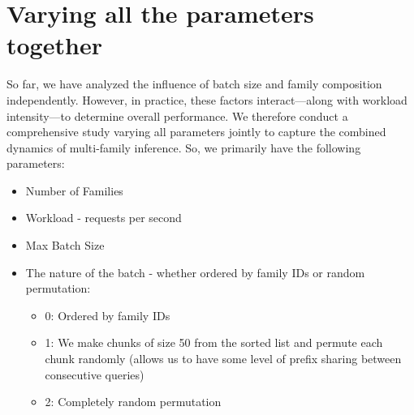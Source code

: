 \section{Varying all the parameters together}
So far, we have analyzed the influence of batch size and family composition independently. However, in practice, these factors interact—along with workload intensity—to determine overall performance. We therefore conduct a comprehensive study varying all parameters jointly to capture the combined dynamics of multi-family inference. So, we primarily have the following parameters:
\begin{itemize}
    \item Number of Families
    \item Workload - requests per second
    \item Max Batch Size
    \item The nature of the batch - whether ordered by family IDs or random permutation:
    \begin{itemize}
        \item 0: Ordered by family IDs
        \item 1: We make chunks of size 50 from the sorted list and permute each chunk randomly (allows us to have some level of prefix sharing between consecutive queries)
        \item 2: Completely random permutation
    \end{itemize}
\end{itemize}

